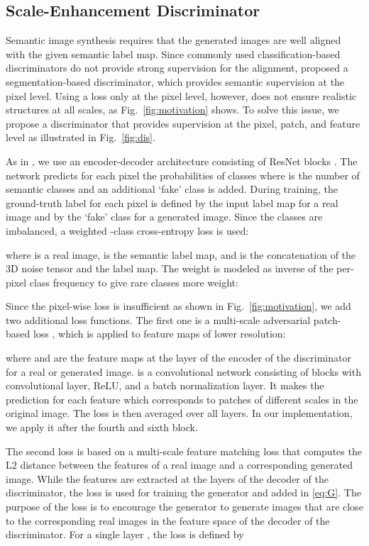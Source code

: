 \documentclass{bmvc2k}
\newcommand{\figref}[1]{Fig.~\ref{#1}}
\begin{document}
\subsection{Scale-Enhancement Discriminator}\label{sec:disc}

Semantic image synthesis requires that the generated images are well aligned with the given semantic label map. Since commonly used classification-based discriminators \cite{park2019semantic} do not provide strong supervision for the alignment, \cite{schonfeld_sushko_iclr2021} proposed a segmentation-based discriminator, which provides semantic supervision at the pixel level. Using a loss only at the pixel level, however, does not ensure realistic structures at all scales, as \figref{fig:motivation} shows. To solve this issue, we propose a discriminator that provides supervision at the pixel, patch, and feature level as illustrated in \figref{fig:dis}.

As in \cite{schonfeld_sushko_iclr2021}, we use an encoder-decoder architecture consisting of ResNet blocks \cite{he2016deep}. The network predicts for each pixel the probabilities of  classes where  is the number of semantic classes and an additional `fake' class is added.
During training, the ground-truth label for each pixel is defined by the input label map for a real image and by the `fake' class for a generated image. 
Since the classes are imbalanced, a weighted -class cross-entropy loss is used:

where  is a real image,  is the semantic label map, and  is the concatenation of the 3D noise tensor and the label map.
The weight  is modeled as inverse of the per-pixel class frequency to give rare classes more weight:


Since the pixel-wise loss is insufficient as shown in \figref{fig:motivation}, we add two additional loss functions. The first one is a multi-scale adversarial patch-based loss \cite{miyato2018spectral}, which is applied to feature maps of lower resolution:   

where  and  are the feature maps at the layer  of the encoder of the discriminator for a real or generated image.  is a convolutional network consisting of blocks with convolutional layer, ReLU, and a batch
normalization layer. It makes the prediction for each feature which corresponds to patches of different scales in the original image. The loss  is then averaged over all layers. In our implementation, we apply it after the  fourth and sixth block. 

The second loss is based on a multi-scale feature matching loss \cite{johnson2016perceptual} that computes the L2 distance between the features of a real image and a corresponding generated image. While the features are extracted at the layers of the decoder of the discriminator, the loss is used for training the generator  and added in \eqref{eq:G}. The purpose of the loss is to encourage the generator to generate images that are close to the corresponding real images in the feature space of the decoder of the discriminator. For a single layer , the loss is defined by        
\end{document}
